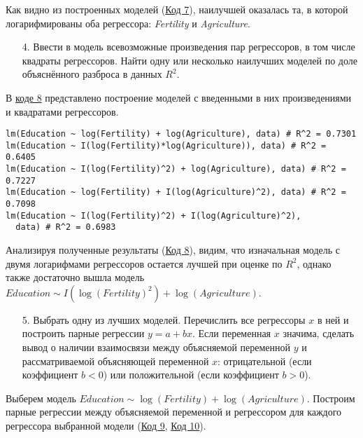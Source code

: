 Как видно из построенных моделей (\hyperref[code:7]{Код 7}), наилучшей оказалась та, в которой логарифмированы оба регрессора: \textit{Fertility} и \textit{Agriculture}. 

\begin{enumerate}
    \item[4.] Ввести в модель всевозможные произведения пар регрессоров, в том числе квадраты регрессоров. Найти одну или несколько наилучших моделей по доле объяснённого разброса в данных $R^2$.
\end{enumerate}

В \hyperref[code:8]{коде 8} представлено построение моделей с введенными в них произведениями и квадратами регрессоров.

\begin{code}
\begin{verbatim}
lm(Education ~ log(Fertility) + log(Agriculture), data) # R^2 = 0.7301
lm(Education ~ I(log(Fertility)*log(Agriculture)), data) # R^2 = 0.6405
lm(Education ~ I(log(Fertility)^2) + log(Agriculture), data) # R^2 = 0.7227
lm(Education ~ log(Fertility) + I(log(Agriculture)^2), data) # R^2 = 0.7098
lm(Education ~ I(log(Fertility)^2) + I(log(Agriculture)^2),
  data) # R^2 = 0.6983
\end{verbatim}
\label{code:8}
\end{code}

Анализируя полученные результаты (\hyperref[code:8]{Код 8}), видим, что изначальная модель с двумя логарифмами регрессоров остается лучшей при оценке по $R^2$, однако также достаточно  вышла модель $Education \sim I(\log(Fertility)^2) + \log(Agriculture)$.

\begin{enumerate}
    \item[5.] Выбрать одну из лучших моделей. Перечислить все регрессоры $x$ в ней и построить парные регрессии $y = a + bx$. Если переменная $x$ значима, сделать вывод о наличии взаимосвязи между объясняемой переменной $y$ и рассматриваемой объясняющей переменной $x$: отрицательной (если коэффициент $b<0$) или положительной (если коэффициент $b>0$).
\end{enumerate}

Выберем модель $Education \sim \log(\textit{Fertility}) + \log(\textit{Agriculture})$. Построим парные регрессии между объясняемой переменной и регрессором для каждого регрессора выбранной модели (\hyperref[code:9]{Код 9}, \hyperref[code:10]{Код 10}).

